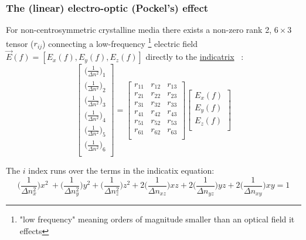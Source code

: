 \subsubsection{The (linear) electro-optic (Pockel's) effect}

For non-centrosymmetric crystalline media there exists a non-zero rank 2, $6 \times 3$ tensor ($r_{ij}$) connecting a low-frequency \footnote{"low frequency" meaning orders of magnitude smaller than an optical field it effects} electric field $\vec{E}(f) = [E_x(f), E_y(f), E_z(f)]$ directly to the \hyperref[sec:indicatrix]{indicatrix} ~\cite{yariv,nye}:
\begin{equation}
  \left[ {\begin{array}{c}
   \big( \frac{1}{\Delta n ^2 } \big)_1 \\
   \big( \frac{1}{\Delta n ^2 } \big)_2 \\
   \big( \frac{1}{\Delta n ^2 } \big)_3 \\
   \big( \frac{1}{\Delta n ^2 } \big)_4 \\
   \big( \frac{1}{\Delta n ^2 } \big)_5 \\
   \big( \frac{1}{\Delta n ^2 } \big)_6 \\
  \end{array} } \right]
  =
%
 \left[ {\begin{array}{ccc}
   r_{11} & r_{12} & r_{13}\\
   r_{21} & r_{22} & r_{23}\\
   r_{31} & r_{32} & r_{33}\\
   r_{41} & r_{42} & r_{43}\\
   r_{51} & r_{52} & r_{53}\\
   r_{61} & r_{62} & r_{63}\\
  \end{array}} \right]
 \left[{\begin{array}{c}
   E_x (f)\\
   E_y (f)\\
   E_z (f)\\
 \end{array}} \right]
\end{equation}

\noindent The $i$ index runs over the terms in the indicatix equation:
\begin{equation}
\bigg(\frac{1}{\Delta n_x^2} \bigg) x^2\ + \bigg(\frac{1}{\Delta n_y^2} \bigg) y^2 + \bigg(\frac{1}{\Delta n_z^2} \bigg) z^2 + 2 \bigg(\frac{1}{\Delta n_{xz}} \bigg)xz + 2 \bigg(\frac{1}{\Delta n_{yz}} \bigg)yz + 2 \bigg(\frac{1}{\Delta n_{xy}} \bigg)xy = 1
\end{equation}

